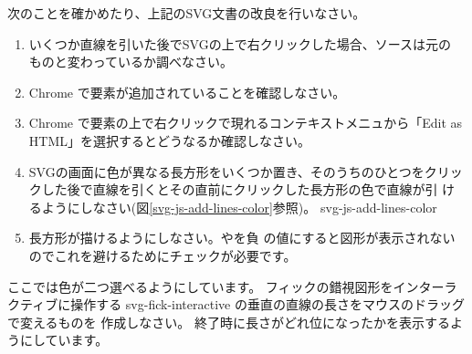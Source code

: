 {次のことを確かめたり、上記のSVG文書の改良を行いなさい。
\begin{enumerate}
 \item いくつか直線を引いた後でSVGの上で右クリックした場合、ソースは元の
       ものと変わっているか調べなさい。
 \item Chrome で要素が追加されていることを確認しなさい。
 \item Chrome で要素の上で右クリックで現れるコンテキストメニュから「Edit
			 as HTML」を選択するとどうなるか確認しなさい。
 \item SVGの画面に色が異なる長方形をいくつか置き、そのうちのひとつをクリッ
       クした後で直線を引くとその直前にクリックした長方形の色で直線が引
       けるようにしなさい(図\ref{svg-js-add-lines-color}参照)。
{svg-js-add-lines-color}
 \item 長方形が描けるようにしなさい。やを負
 の値にすると図形が表示されないのでこれを避けるためにチェックが必要です。
\end{enumerate}
}{ここでは色が二つ選べるようにしています。}
{フィックの錯視図形をインターラクティブに操作する}
{svg-fick-interactive}
{の垂直の直線の長さをマウスのドラッグで変えるものを
作成しなさい。}
{終了時に長さがどれ位になったかを表示するようにしています。}